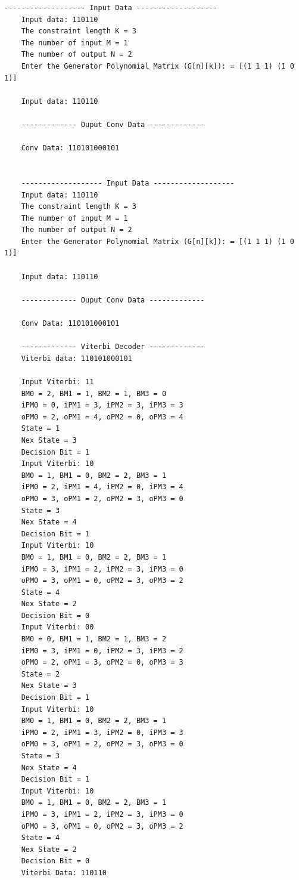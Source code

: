 \begin{lstlisting}[style=StyleResult]
	------------------- Input Data -------------------
	Input data: 110110
	The constraint length K = 3
	The number of input M = 1
	The number of output N = 2
	Enter the Generator Polynomial Matrix (G[n][k]): = [(1 1 1) (1 0 1)]
	
	Input data: 110110
	
	------------- Ouput Conv Data -------------
	
	Conv Data: 110101000101
	
	
	------------------- Input Data -------------------
	Input data: 110110
	The constraint length K = 3
	The number of input M = 1
	The number of output N = 2
	Enter the Generator Polynomial Matrix (G[n][k]): = [(1 1 1) (1 0 1)]
	
	Input data: 110110
	
	------------- Ouput Conv Data -------------
	
	Conv Data: 110101000101
	
	------------- Viterbi Decoder -------------
	Viterbi data: 110101000101
	
	Input Viterbi: 11
	BM0 = 2, BM1 = 1, BM2 = 1, BM3 = 0
	iPM0 = 0, iPM1 = 3, iPM2 = 3, iPM3 = 3
	oPM0 = 2, oPM1 = 4, oPM2 = 0, oPM3 = 4
	State = 1
	Nex State = 3
	Decision Bit = 1
	Input Viterbi: 10
	BM0 = 1, BM1 = 0, BM2 = 2, BM3 = 1
	iPM0 = 2, iPM1 = 4, iPM2 = 0, iPM3 = 4
	oPM0 = 3, oPM1 = 2, oPM2 = 3, oPM3 = 0
	State = 3
	Nex State = 4
	Decision Bit = 1
	Input Viterbi: 10
	BM0 = 1, BM1 = 0, BM2 = 2, BM3 = 1
	iPM0 = 3, iPM1 = 2, iPM2 = 3, iPM3 = 0
	oPM0 = 3, oPM1 = 0, oPM2 = 3, oPM3 = 2
	State = 4
	Nex State = 2
	Decision Bit = 0
	Input Viterbi: 00
	BM0 = 0, BM1 = 1, BM2 = 1, BM3 = 2
	iPM0 = 3, iPM1 = 0, iPM2 = 3, iPM3 = 2
	oPM0 = 2, oPM1 = 3, oPM2 = 0, oPM3 = 3
	State = 2
	Nex State = 3
	Decision Bit = 1
	Input Viterbi: 10
	BM0 = 1, BM1 = 0, BM2 = 2, BM3 = 1
	iPM0 = 2, iPM1 = 3, iPM2 = 0, iPM3 = 3
	oPM0 = 3, oPM1 = 2, oPM2 = 3, oPM3 = 0
	State = 3
	Nex State = 4
	Decision Bit = 1
	Input Viterbi: 10
	BM0 = 1, BM1 = 0, BM2 = 2, BM3 = 1
	iPM0 = 3, iPM1 = 2, iPM2 = 3, iPM3 = 0
	oPM0 = 3, oPM1 = 0, oPM2 = 3, oPM3 = 2
	State = 4
	Nex State = 2
	Decision Bit = 0
	Viterbi Data: 110110
\end{lstlisting}

%